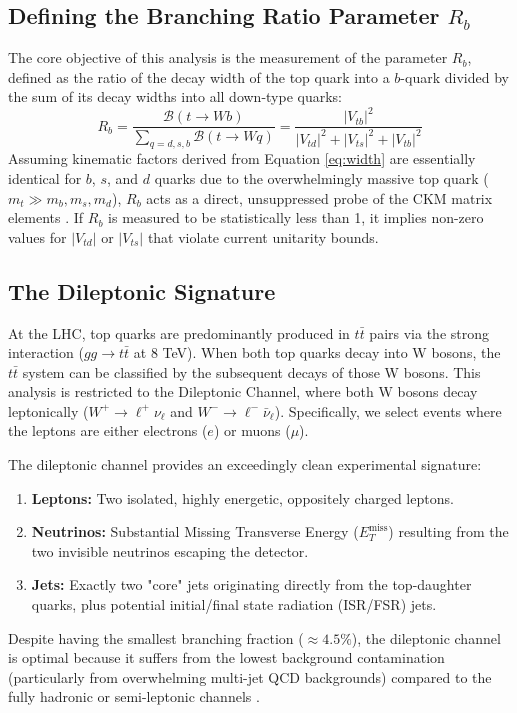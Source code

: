 \documentclass[11pt,a4paper]{article}
\begin{document}
\subsection{Defining the Branching Ratio Parameter $R_b$}
The core objective of this analysis is the measurement of the parameter $R_b$, defined as the ratio of the decay width of the top quark into a $b$-quark divided by the sum of its decay widths into all down-type quarks:
\begin{equation}
R_b = \frac{\mathcal{B}(t \rightarrow Wb)}{\sum_{q=d,s,b} \mathcal{B}(t \rightarrow Wq)} = \frac{|V_{tb}|^{2}}{|V_{td}|^{2} + |V_{ts}|^{2} + |V_{tb}|^{2}} \label{eq:rb}
\end{equation}
Assuming kinematic factors derived from Equation \ref{eq:width} are essentially identical for $b$, $s$, and $d$ quarks due to the overwhelmingly massive top quark ($m_t \gg m_b, m_s, m_d$), $R_b$ acts as a direct, unsuppressed probe of the CKM matrix elements \cite{cms_paper}. If $R_b$ is measured to be statistically less than 1, it implies non-zero values for $|V_{td}|$ or $|V_{ts}|$ that violate current unitarity bounds.

\subsection{The Dileptonic Signature}
At the LHC, top quarks are predominantly produced in $t\bar{t}$ pairs via the strong interaction ($gg \to t\bar{t}$ at 8 TeV). When both top quarks decay into W bosons, the $t\bar{t}$ system can be classified by the subsequent decays of those W bosons. This analysis is restricted to the Dileptonic Channel, where both W bosons decay leptonically ($W^{+} \rightarrow \ell^{+}\nu_{\ell}$ and $W^{-} \rightarrow \ell^{-}\bar{\nu}_{\ell}$). Specifically, we select events where the leptons are either electrons ($e$) or muons ($\mu$).

The dileptonic channel provides an exceedingly clean experimental signature:
\begin{enumerate}
    \item \textbf{Leptons:} Two isolated, highly energetic, oppositely charged leptons.
    \item \textbf{Neutrinos:} Substantial Missing Transverse Energy ($E_{T}^{\text{miss}}$) resulting from the two invisible neutrinos escaping the detector.
    \item \textbf{Jets:} Exactly two "core" jets originating directly from the top-daughter quarks, plus potential initial/final state radiation (ISR/FSR) jets.
\end{enumerate}
Despite having the smallest branching fraction ($\approx 4.5\%$), the dileptonic channel is optimal because it suffers from the lowest background contamination (particularly from overwhelming multi-jet QCD backgrounds) compared to the fully hadronic or semi-leptonic channels \cite{pdg}.
\end{document}
